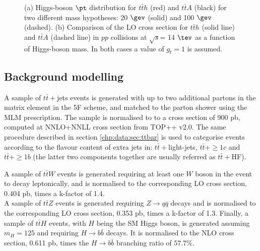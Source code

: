 \begin{figure}[htbp!]
\begin{subfigure}{0.45\textwidth}
  \caption{}
  \label{sec:ttA:fig:xsec}
\end{subfigure}
\captionsetup{width=0.85\textwidth} \caption{\small (a) Higgs-boson $\pt$ distribution for $t\bar{t}h$ (red) and $t\bar{t}A$ (black) for two different mass hypotheses: 20 $\gev$ (solid) and 100 $\gev$ (dashed). (b) Comparison of the LO cross section for $t\bar{t}h$ (solid line) and  $t\bar{t}A$ (dashed line) in $pp$ collisions at $\sqrt{s}$= 14 $\tev$ as a function of Higgs-boson mass.  In both cases a value of $g_{t}= 1$ is assumed.}
\label{sec:ttA:fig:gamma5}
\end{figure}


\subsection{Background modelling}

A sample of $t\bar{t}+$jets events is generated with up to two additional partons in the matrix element in the 5F scheme, and matched to the parton shower using the MLM prescription. 
The sample is normalised to to a cross section of 900 pb, computed at NNLO+NNLL cross section from {\sc TOP++} v2.0. The same procedure described in section \ref{chp:data:sec:ttbar} is used to categorise events according to the flavour content of extra jets in: $t\bar{t}+$light-jets, $t\bar{t}+\ge 1c$ and $t\bar{t}+\ge 1b$ (the latter two components together are usually referred as $t\bar{t}+$HF).

A sample of $t\bar{t}W$ events is generated requiring at least one $W$ boson in the event to decay leptonically, and  is  normalised  to  the  corresponding  LO  cross  section,  0.404  pb,  times  a  k-factor  of  1.4.\\
A sample of $t\bar{t}Z$ events is generated requiring $Z\to q\bar{q}$ decays and is normalised to the corresponding LO cross section,  0.353 pb,  times a
k-factor of 1.3. Finally, a sample of $t\bar{t}H$ events, with $H$ being the SM Higgs boson, is generated assuming $m_{H} = 125$ \gev and requiring $H\to b\bar{b}$ decays. It is normalised to the NLO cross section, 0.611 pb, times the $H\to b\bar{b}$ branching ratio of $57.7\%$. 

